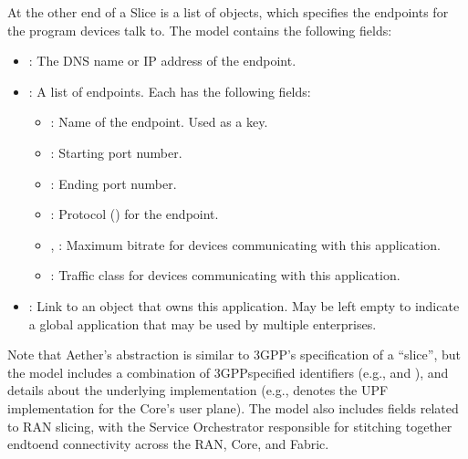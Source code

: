 \documentclass[a4paper,11pt,english]{sphinxmanual}
\begin{document}
\sphinxAtStartPar
At the other end of a Slice is a list of  objects, which
specifies the endpoints for the program devices talk to. The
 model contains the following fields:
\begin{itemize}
\item {} 
\sphinxAtStartPar
{}: The DNS name or IP address of the endpoint.

\item {} 
\sphinxAtStartPar
{}: A list of endpoints. Each has the following
fields:
\begin{itemize}
\item {} 
\sphinxAtStartPar
{}: Name of the endpoint. Used as a key.

\item {} 
\sphinxAtStartPar
{}: Starting port number.

\item {} 
\sphinxAtStartPar
{}: Ending port number.

\item {} 
\sphinxAtStartPar
{}:  Protocol () for the endpoint.

\item {} 
\sphinxAtStartPar
{}, : Maximum bitrate for devices communicating with this
application.

\item {} 
\sphinxAtStartPar
{}: Traffic class for devices communicating with this application.

\end{itemize}

\item {} 
\sphinxAtStartPar
{}: Link to an  object that owns this
application. May be left empty to indicate a global application that
may be used by multiple enterprises.

\end{itemize}

\sphinxAtStartPar
Note that Aether’s  abstraction is similar to 3GPP’s
specification of a “slice”, but the  model includes a
combination of 3GPP\sphinxhyphen{}specified identifiers (e.g.,  and ), and
details about the underlying implementation (e.g.,  denotes the
UPF implementation for the Core’s user plane). The  model also
includes fields related to RAN slicing, with the Service Orchestrator
responsible for stitching together end\sphinxhyphen{}to\sphinxhyphen{}end connectivity across the
RAN, Core, and Fabric.
\end{document}
